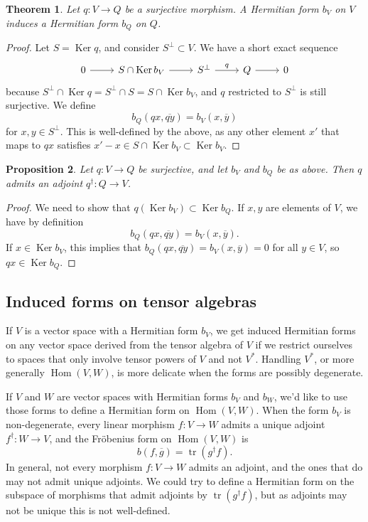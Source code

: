 \documentclass[10pt,a4paper]{amsart}
\newtheorem{theo}{Theorem}[section]
\newtheorem{prop}[theo]{Proposition}
\theoremstyle{definition}
\def\ov#1{\overline{#1}}
\DeclareMathOperator{\Ker}{Ker}
\DeclareMathOperator{\Hom}{Hom}
\DeclareMathOperator{\tr}{tr}
\begin{document}
\begin{theo}
Let $q : V \to Q$ be a surjective morphism. A Hermitian form $b_V$ on $V$ induces a Hermitian form $b_Q$ on $Q$.
\end{theo}

\begin{proof}
Let $S = \Ker q$, and consider $S^\perp \subset V$. We have a short exact sequence
\[
\begin{tikzcd}
0 \ar[r] &
S \cap \Ker b_V \ar[r] &
S^\perp \ar[r,"q"] &
Q \ar[r] &
0
\end{tikzcd}
\]
because $S^\perp \cap \Ker q = S^\perp \cap S = S \cap \Ker b_V$, and $q$ restricted to $S^\perp$ is still surjective. We define
\[
b_Q(qx, \ov{qy})
= b_V(x, \ov y)
\]
for $x, y \in S^\perp$. This is well-defined by the above, as any other element $x'$ that maps to $qx$ satisfies $x' - x \in S \cap \Ker b_V \subset \Ker b_V$.
\end{proof}



\begin{prop}
Let $q : V \to Q$ be surjective, and let $b_V$ and $b_Q$ be as above. Then $q$ admits an adjoint $q^\dagger : Q \to V$.
\end{prop}

\begin{proof}
We need to show that $q(\Ker b_V) \subset \Ker b_Q$. If $x, y$ are elements of $V$, we have by definition
\[
b_Q(qx, \ov{qy}) = b_V(x, \ov y).
\]
If $x \in \Ker b_V$, this implies that $b_Q(qx, \ov{qy}) = b_V(x, \ov y) = 0$ for all $y \in V$, so $qx \in \Ker b_Q$.
\end{proof}





\subsection*{Induced forms on tensor algebras}
\label{sec:induced-forms-tensor}


If $V$ is a vector space with a Hermitian form $b_V$, we get induced Hermitian forms on any vector space derived from the tensor algebra of $V$ if we restrict ourselves to spaces that only involve tensor powers of $V$ and not $V^*$. Handling $V^*$, or more generally $\Hom(V,W)$, is more delicate when the forms are possibly degenerate.



If $V$ and $W$ are vector spaces with Hermitian forms $b_V$ and $b_W$, we'd like to use those forms to define a Hermitian form on $\Hom(V,W)$. When the form $b_V$ is non-degenerate, every linear morphism $f : V \to W$ admits a unique adjoint $f^\dagger : W \to V$, and the Fr\"obenius form on $\Hom(V,W)$ is
\[
b(f, \ov g) = \tr(g^\dagger f).
\]
In general, not every morphism $f : V \to W$ admits an adjoint, and the ones that do may not admit unique adjoints. We could try to define a Hermitian form on the subspace of morphisms that admit adjoints by $\tr(g^\dagger f)$, but as adjoints may not be unique this is not well-defined.
\end{document}
